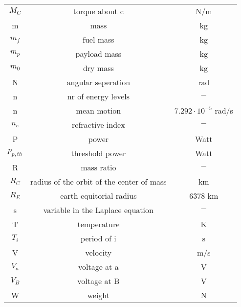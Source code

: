 \documentclass{report}
\begin{document}
\begin{table}
\begin{tabular}{c|c|c}
        $M_C$ & torque about c &        N/m \\

         m &       mass &         kg \\

        $m_f$ &  fuel mass &         kg \\

        $m_p$ & payload mass &         kg \\

        $m_0$ &   dry mass &         kg \\

         N & angular seperation &        rad \\

         n & nr of energy levels &          $-$ \\

         n & mean motion & $7.292\cdot 10^{ - 5}$ rad/s \\

        $n_e$ & refractive index &          $-$ \\

         P &      power &       Watt \\

     $p_{p,th}$ & threshold power &       Watt \\

         R & mass ratio &          $-$ \\

        $R_C$ & radius of the orbit of the center of mass &         km \\

        $R_E$ & earth equitorial radius &    6378 km \\

         s & variable in the Laplace equation &          $-$ \\

         T & temperature &          K \\

        $T_i$ & period of i &          s \\

         V &   velocity &        m/s \\

        $V_a$ & voltage at a &          V \\

        $V_B$ & voltage at B &          V \\

         W &     weight &          N \\


\end{tabular}
\end{table}
\end{document}
